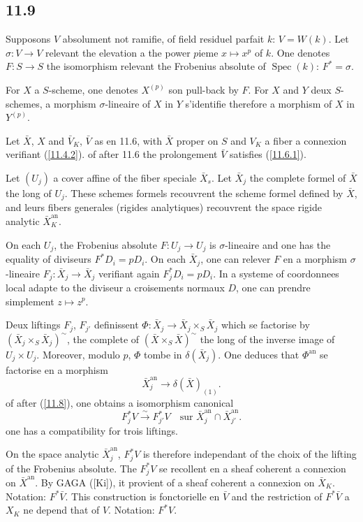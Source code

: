\documentclass[12pt,a4paper]{article}
\theoremstyle{plain}
\theoremstyle{definition}
\theoremstyle{remark}
\DeclareMathOperator{\Spec}{Spec}
\newcommand{\an}{\mathrm{an}}
\begin{document}
\subsection*{11.9}

Supposons $V$ absolument not ramifie, of field residuel parfait $k$: $V = W(k)$. Let $\sigma: V \to V$ relevant the elevation a the power $p$ieme $x \mapsto x^p$ of $k$. One denotes $F: S \to S$ the isomorphism relevant the Frobenius absolute of $\Spec(k)$: $F^* = \sigma$.

For $X$ a $S$-scheme, one denotes $X^{(p)}$ son pull-back by $F$. For $X$ and $Y$ deux $S$-schemes, a morphism $\sigma$-lineaire of $X$ in $Y$ s'identifie therefore a morphism of $X$ in $Y^{(p)}$.

Let $\bar{X}$, $X$ and $\bar{V}_K$, $\bar{V}$ as en 11.6, with $\bar{X}$ proper on $S$ and $V_K$ a fiber a connexion verifiant (\ref{11.4.2}). of after 11.6 the prolongement $\bar{V}$ satisfies (\ref{11.6.1}).

Let $(U_j)$ a cover affine of the fiber speciale $\bar{X}_s$. Let $\bar{X}_j$ the complete formel of $\bar{X}$ the long of $U_j$. These schemes formels recouvrent the scheme formel defined by $\bar{X}$, and leurs fibers generales (rigides analytiques) recouvrent the space rigide analytic $\bar{X}_K^{\an}$.

On each $U_j$, the Frobenius absolute $F: U_j \to U_j$ is $\sigma$-lineaire and one has the equality of diviseurs $F^* D_i = p D_i$. On each $\bar{X}_j$, one can relever $F$ en a morphism $\sigma$-lineaire $F_j: \bar{X}_j \to \bar{X}_j$ verifiant again $F_j^* D_i = p D_i$. In a systeme of coordonnees local adapte to the diviseur a croisements normaux $D$, one can prendre simplement $z \mapsto z^p$.

Deux liftings $F_j$, $F_{j'}$ definissent $\Phi: \bar{X}_j \to \bar{X}_j \times_S \bar{X}_j$ which se factorise by $(\bar{X}_j \times_S \bar{X}_j)^\sim$, the complete of $(\bar{X} \times_S \bar{X})^\sim$ the long of the inverse image of $U_j \times U_j$. Moreover, modulo $p$, $\Phi$ tombe in $\delta(\bar{X}_j)$. One deduces that $\Phi^{\an}$ se factorise en a morphism
$$\bar{X}_j^{\an} \longrightarrow \delta(\bar{X})_{(1)}.$$
of after (\ref{11.8}), one obtains a isomorphism canonical
$$F_j^* V \xrightarrow{\sim} F_{j'}^* V \quad \text{sur } \bar{X}_j^{\an} \cap \bar{X}_{j'}^{\an}.$$
one has a compatibility for trois liftings.

On the space analytic $\bar{X}_j^{\an}$, $F_j^* V$ is therefore independant of the choix of the lifting of the Frobenius absolute. The $F_j^* V$ se recollent en a sheaf coherent a connexion on $\bar{X}^{\an}$. By GAGA ([Ki]), it provient of a sheaf coherent a connexion on $\bar{X}_K$. Notation: $F^* \bar{V}$. This construction is fonctorielle en $\bar{V}$ and the restriction of $F^* \bar{V}$ a $X_K$ ne depend that of $V$. Notation: $F^* V$.
\end{document}
